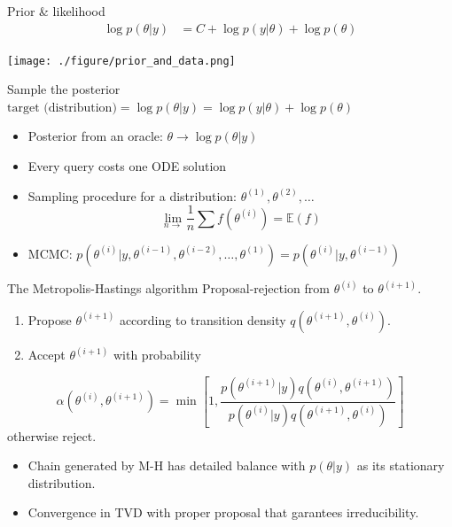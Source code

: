 \documentclass[bigger]{beamer}
\begin{document}
\begin{frame}[label={sec:org2aa1a9f}]{Prior \& likelihood}
\begin{align*}
  \log{p(\theta|y)} &= C + \log{p(y | \theta)} + \log{p(\theta)}
\end{align*}
\begin{center}
\texttt{[image: ./figure/prior\_and\_data.png]}
\end{center}
\end{frame}


\begin{frame}[label={sec:org40c9c6d}]{Sample the posterior}
\(\text{target (distribution)} = \log{p(\theta|y)} = \log{p(y | \theta)} + \log{p(\theta)}\)

\begin{itemize}
\item <1-> Posterior from an oracle: \(\theta \rightarrow \log{p(\theta | y)}\)
\item <2-> Every query costs one ODE solution
\item <3-> Sampling procedure for a distribution: \(\theta^{(1)}, \theta^{(2)}, \dots\)
\begin{equation*}
  \lim_{n\rightarrow }\frac{1}{n}\sum{f(\theta^{(i)})}=\mathbb{E}(f)
\end{equation*}
\item <4-> MCMC: \(p(\theta^{(i)} | y, \theta^{(i-1)},  \theta^{(i-2)}, \dots, \theta^{(1)})=p(\theta^{(i)} | y, \theta^{(i-1)})\)
\end{itemize}
\end{frame}

\begin{frame}[label={sec:org6aa4db4}]{The Metropolis-Hastings algorithm}
Proposal-rejection from \(\theta^{(i)}\) to \(\theta^{(i+1)}\).
\begin{enumerate}
\item Propose \(\theta^{(i+1)}\) according to transition density \(q(\theta^{(i+1)}, \theta^{(i)})\).
\item Accept \(\theta^{(i+1)}\) with probability
\end{enumerate}
\begin{equation}
  \alpha(\theta^{(i)}, \theta^{(i+1)}) = \min\left[
    1, \frac{p(\theta^{(i+1)}|y)q(\theta^{(i)}, \theta^{(i+1)})}{p(\theta^{(i)}|y)q(\theta^{(i+1)}, \theta^{(i)})}
    \right]
\end{equation}
otherwise reject.

\begin{itemize}
\item Chain generated by M-H has detailed balance with \(p(\theta|y)\) as
its stationary distribution.
\item Convergence in TVD with proper proposal that garantees irreducibility.
\end{itemize}
\end{frame}
\end{document}
